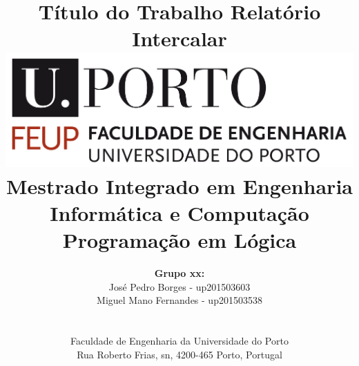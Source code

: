 \documentclass[a4paper]{article}
\begin{document}
\setlength{\textwidth}{16cm}
\setlength{\textheight}{22cm}

\title{\Huge\textbf{Título do Trabalho}\linebreak\linebreak\linebreak
\Large\textbf{Relatório Intercalar}\linebreak\linebreak
\linebreak\linebreak
\includegraphics[scale=0.1]{feup-logo.png}\linebreak\linebreak
\linebreak\linebreak
\Large{Mestrado Integrado em Engenharia Informática e Computação} \linebreak\linebreak
\Large{Programação em Lógica}\linebreak
}

\author{\textbf{Grupo xx:}\\
José Pedro Borges - up201503603 \\
Miguel Mano Fernandes - up201503538 \\
\linebreak\linebreak \\
 \\ Faculdade de Engenharia da Universidade do Porto \\ Rua Roberto Frias, s\/n, 4200-465 Porto, Portugal \linebreak\linebreak\linebreak
\linebreak\linebreak\vspace{1cm}}

\maketitle
\thispagestyle{empty}
\end{document}
